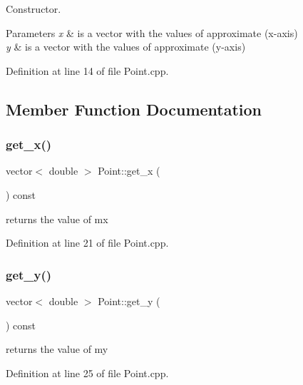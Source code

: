 Constructor. 


\begin{DoxyParams}{Parameters}
{\em x} & is a vector with the values of approximate (x-\/axis) \\
\hline
{\em y} & is a vector with the values of approximate (y-\/axis) \\
\hline
\end{DoxyParams}


Definition at line 14 of file Point.\+cpp.



\subsection{Member Function Documentation}
\mbox{\label{class_point_a0badc8959ee9db08740cf22abcb8d8db}} 
\subsubsection{\texorpdfstring{get\+\_\+x()}{get\_x()}}
{\footnotesize\ttfamily vector$<$ double $>$ Point\+::get\+\_\+x (\begin{DoxyParamCaption}{ }\end{DoxyParamCaption}) const}



returns the value of mx 



Definition at line 21 of file Point.\+cpp.

\mbox{\label{class_point_a5d9ab69bfb09db813d543a8cd2fb24c7}} 
\subsubsection{\texorpdfstring{get\+\_\+y()}{get\_y()}}
{\footnotesize\ttfamily vector$<$ double $>$ Point\+::get\+\_\+y (\begin{DoxyParamCaption}{ }\end{DoxyParamCaption}) const}



returns the value of my 



Definition at line 25 of file Point.\+cpp.

\mbox{\label{class_point_a7a9b270860e9198583176ad5c42f9187}} 
